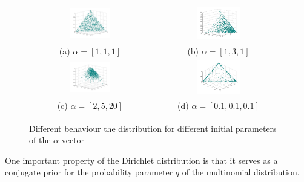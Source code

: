 \documentclass[twoside,hidelinks]{article}
\begin{document}
    \begin{figure}[!h]
        \begin{tabular}{cc}
       	          \includegraphics[width=0.35\textwidth]{uniformDist} & \includegraphics[width=0.35\textwidth]{1-3-1Ddist} \\
    		(a) $ \alpha = [1,1,1] $ & (b) $ \alpha = [1,3,1] $  \\[6pt]
    		 \includegraphics[width=0.35\textwidth]{2-5-20Dist} &    \includegraphics[width=0.35\textwidth]{01-01-01Dist} \\
    		(c) $ \alpha = [2,5,20] $  & (d) $ \alpha = [0.1,0.1,0.1] $  \\[6pt]
    	\end{tabular}
    	\caption{Different behaviour the distribution for different initial parameters of the $\alpha$ vector}
    	\label{firstplot}
     \end{figure}

One important property of the Dirichlet distribution is that it serves as a conjugate prior for the probability parameter $q$ of the multinomial distribution. 
\end{document}
